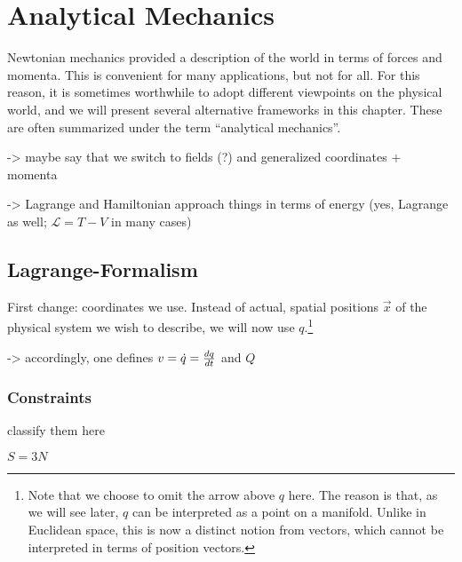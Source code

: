 \documentclass[../class_mech_main.tex]{subfiles}
\begin{document}
\chapter{Analytical Mechanics}

Newtonian mechanics provided a description of the world in terms of forces and momenta. This is convenient for many applications, but not for all. For this reason, it is sometimes worthwhile to adopt different viewpoints on the physical world, and we will present several alternative frameworks in this chapter. These are often summarized under the term \enquote{analytical mechanics}.


-> maybe say that we switch to fields (?) and generalized coordinates + momenta


-> Lagrange and Hamiltonian approach things in terms of energy (yes, Lagrange as well; $\mathcal{L} = T - V$ in many cases)



	\section{Lagrange-Formalism}
First change: coordinates we use. Instead of actual, spatial positions $\vec{x}$ of the physical system we wish to describe, we will now use  $q$.\footnote{Note that we choose to omit the arrow above $q$ here. The reason is that, as we will see later, $q$ can be interpreted as a point on a manifold. Unlike in Euclidean space, this is now a distinct notion from vectors, which cannot be interpreted in terms of position vectors.}


-> accordingly, one defines  $v = \dot{q} = \dv{q}{t}$ and  $Q$



		\subsection{Constraints}
classify them here

$S = 3N$
\end{document}
